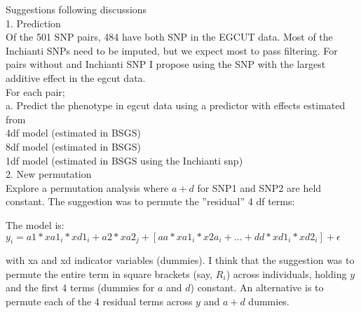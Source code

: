 \documentclass[paper=a4, fontsize=11pt]{scrartcl}         %
\numberwithin{equation}{section}                  %
\numberwithin{figure}{section}                    %
\numberwithin{table}{section}                   %
\begin{document}
\newpage

Suggestions following discussions \\

1. Prediction \\
Of the 501 SNP pairs, 484 have both SNP in the EGCUT data. Most of the Inchianti SNPs need to be imputed, but we expect most to pass filtering. For pairs without and Inchianti SNP I propose using the SNP with the largest additive effect in the egcut data. \\

For each pair; \\

a. Predict the phenotype in egcut data using a predictor with effects estimated from \\

4df model (estimated in BSGS) \\
8df model (estimated in BSGS) \\
1df model (estimated in BSGS using the Inchianti snp) \\


2. New permutation \\

Explore a permutation analysis where $a+d$ for SNP1 and SNP2 are held constant. The suggestion was to permute the ''residual'' 4 df terms:

The model is: \\

$y_i=a1*xa1_i*xd1_i+a2*xa2_j+\left [ aa*xa1_i*x2a_i+...+dd*xd1_i*xd2_i \right ]+\epsilon $


with xa and xd indicator variables (dummies). I think that the suggestion was to permute the entire term in square brackets (say, $R_i$) across individuals, holding $y$ and the first 4 terms (dummies for $a$ and $d$) constant. An alternative is to permute each of the 4 residual terms across $y$ and $a+d$ dummies.














\end{document}
